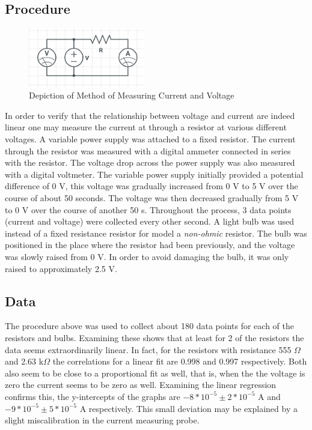 \documentclass[11pt]{article}
\begin{document}
\subsection{Procedure}
\begin{figure}[h]
	\begin{center}
		\includegraphics[width=2in]{Ohm}
	\end{center}
	\caption{Depiction of Method of Measuring Current and Voltage}
\end{figure}
In order to verify that the relationship between voltage and current are indeed linear one may measure the current at through a resistor at various different voltages. A variable power supply was attached to a fixed resistor. The current through the resistor was measured with a digital ammeter connected in series with the resistor. The voltage drop across the power supply was also measured with a digital voltmeter. The variable power supply initially provided a potential difference of 0 V, this voltage was gradually increased from 0 V to 5 V over the course of about 50 seconds. The voltage was then decreased gradually from 5 V to 0 V over the course of another 50 s. Throughout the process, 3 data points (current and voltage) were collected every other second.
A light bulb was used instead of a fixed resistance resistor for model a \textit{non-ohmic} resistor. The bulb was positioned in the place where the resistor had been previously, and the voltage was slowly raised from 0 V. In order to avoid damaging the bulb, it was only raised to approximately 2.5 V.
\subsection{Data}
The procedure above was used to collect about 180 data points for each of the resistors and bulbs. Examining these shows that at least for 2 of the resistors the data seems extraordinarily linear. In fact, for the resistors with resistance 555 \( \Omega \) and 2.63 k\(  \Omega \) the correlations for a linear fit are 0.998 and 0.997 respectively. Both also seem to be close to a proportional fit as well, that is, when the the voltage is zero the current seems to be zero as well. Examining the linear regression confirms this, the y-intercepts of the graphs are \( -8 * 10^{-5} \pm 2 * 10^{-5} \) A and \( -9 * 10^{-5} \pm 5 * 10^{-5} \) A respectively. This small deviation may be explained by a slight miscalibration in the current measuring probe.
\end{document}
